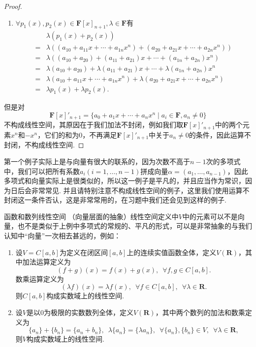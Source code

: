 \begin{proof}
\begin{enumerate}
        \item $\forall p_1(x), p_2(x) \in \mathbf{F}[x]_{n+1}, \lambda \in \mathbf{F}$有
              \begin{align*}
                      & \lambda(p_1(x) + p_2(x))                                                                        \\
                  ={} & \lambda((a_{10} + a_{11}x + \cdots + a_{1n}x^n) + (a_{20} + a_{21}x + \cdots + a_{2n}x^n))      \\
                  ={} & \lambda((a_{10} + a_{20}) + (a_{11} + a_{21})x + \cdots + (a_{1n} + a_{2n})x^n)                 \\
                  ={} & \lambda(a_{10} + a_{20}) + \lambda(a_{11} + a_{21})x + \cdots + \lambda(a_{1n} + a_{2n})x^n     \\
                  ={} & \lambda(a_{10} + a_{11}x + \cdots + a_{1n}x^n) + \lambda(a_{20} + a_{21}x + \cdots + a_{2n}x^n) \\
                  ={} & \lambda p_1(x) + \lambda p_2(x).
              \end{align*}
    \end{enumerate}
    但是对\[\mathbf{F}[x]'_{n+1}=\{a_0+a_1x+\cdots+a_nx^n \mid a_i\in\mathbf{F}, a_n\neq 0\}\]不构成线性空间，其原因在于我们加法不封闭，例如我们取$\mathbf{F}[x]'_{n+1}$中的两个元素$x^n$和$-x^n$，它们的和为$0$，不再满足$\mathbf{F}[x]'_{n+1}$中关于$a_n\neq 0$的条件，因此运算不封闭，不构成线性空间.
\end{proof}

第一个例子实际上是与向量有很大的联系的，因为次数不高于$n-1$次的多项式中，我们可以把所有系数$a_i(i=1,\ldots,n-1)$拼成向量$\alpha=(a_1,\ldots,a_{n-1})$，因此多项式和向量实际上是很类似的，所以这一例子是平凡的，并且应当作为常识，因为日后会非常常见. 并且请特别注意不构成线性空间的例子，这里我们使用运算不封闭这一条件否认，这是非常常用的，在习题中我们还会见到这样的例子.

\begin{example}{}{函数和数列线性空间}
    （向量层面的抽象）线性空间定义中$V$中的元素可以不是向量，也不是类似于上例中多项式的常规的、平凡的形式，可以是非常抽象的与我们认知中``向量''一次相去甚远的，例如：
    \begin{enumerate}
        \item 设$V=C[a,b]$为定义在闭区间$[a,b]$上的连续实值函数全体，定义$V(\mathbf{R})$，其中加法运算定义为
              \[(f+g)(x)=f(x)+g(x),\enspace\forall f,g\in C[a,b].\]
              数乘运算定义为
              \[(\lambda f)(x)=\lambda f(x),\enspace\forall f\in C[a,b],\enspace\forall \lambda\in\mathbf{R}.\]
              则$C[a,b]$构成实数域上的线性空间.

        \item 设$V$是以$0$为极限的实数数列全体，定义$V(\mathbf{R})$，其中两个数列的加法和数乘定义为
              \[\{a_n\}+\{b_n\}=\{a_n+b_n\},\enspace\lambda\{a_n\}=\{\lambda a_n\},\enspace\forall \{a_n\},\{b_n\}\in V,\enspace\forall \lambda\in\mathbf{R},\]
              则$V$构成实数域上的线性空间.
    \end{enumerate}
\end{example}


